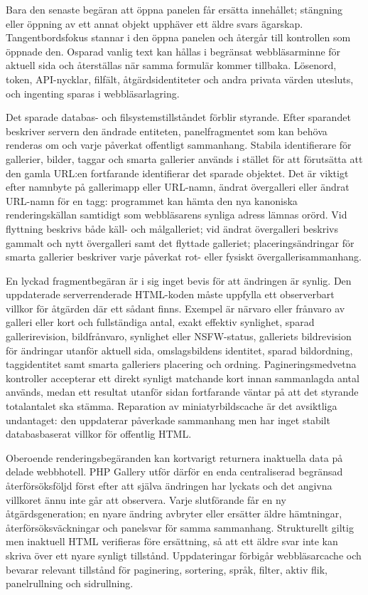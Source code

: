 \documentclass[11pt,a4paper]{article}
\begin{document}
Bara den senaste begäran att öppna panelen får ersätta innehållet; stängning
eller öppning av ett annat objekt upphäver ett äldre svars ägarskap.
Tangentbordsfokus stannar i den öppna panelen och återgår till kontrollen som
öppnade den. Osparad vanlig text kan hållas i begränsat webbläsarminne för
aktuell sida och återställas när samma formulär kommer tillbaka. Lösenord,
token, API-nycklar, filfält, åtgärdsidentiteter och andra privata värden
utesluts, och ingenting sparas i webbläsarlagring.

Det sparade databas- och filsystemstillståndet förblir styrande. Efter sparandet
beskriver servern den ändrade entiteten, panelfragmentet som kan behöva renderas
om och varje påverkat offentligt sammanhang. Stabila identifierare för
gallerier, bilder, taggar och smarta gallerier används i stället för att
förutsätta att den gamla URL:en fortfarande identifierar det sparade objektet.
Det är viktigt efter namnbyte på gallerimapp eller URL-namn, ändrat övergalleri
eller ändrat URL-namn för en tagg: programmet kan hämta den nya kanoniska
renderingskällan samtidigt som webbläsarens synliga adress lämnas orörd. Vid
flyttning beskrivs både käll- och målgalleriet; vid ändrat övergalleri beskrivs
gammalt och nytt övergalleri samt det flyttade galleriet; placeringsändringar
för smarta gallerier beskriver varje påverkat rot- eller fysiskt
övergallerisammanhang.

En lyckad fragmentbegäran är i sig inget bevis för att ändringen är synlig. Den
uppdaterade serverrenderade HTML-koden måste uppfylla ett observerbart villkor
för åtgärden där ett sådant finns. Exempel är närvaro eller frånvaro av galleri
eller kort och fullständiga antal, exakt effektiv synlighet, sparad
gallerirevision, bildfrånvaro, synlighet eller NSFW-status, galleriets
bildrevision för ändringar utanför aktuell sida, omslagsbildens identitet,
sparad bildordning, taggidentitet samt smarta galleriers placering och ordning.
Pagineringsmedvetna kontroller accepterar ett direkt synligt matchande kort
innan sammanlagda antal används, medan ett resultat utanför sidan fortfarande
väntar på att det styrande totalantalet ska stämma. Reparation av
miniatyrbildscache är det avsiktliga undantaget: den uppdaterar påverkade
sammanhang men har inget stabilt databasbaserat villkor för offentlig HTML.

Oberoende renderingsbegäranden kan kortvarigt returnera inaktuella data på
delade webbhotell. PHP Gallery utför därför en enda centraliserad begränsad
återförsöksföljd först efter att själva ändringen har lyckats och det angivna
villkoret ännu inte går att observera. Varje slutförande får en ny
åtgärdsgeneration; en nyare ändring avbryter eller ersätter äldre hämtningar,
återförsöksväckningar och panelsvar för samma sammanhang. Strukturellt giltig
men inaktuell HTML verifieras före ersättning, så att ett äldre svar inte kan
skriva över ett nyare synligt tillstånd. Uppdateringar förbigår webbläsarcache
och bevarar relevant tillstånd för paginering, sortering, språk, filter, aktiv
flik, panelrullning och sidrullning.
\end{document}

